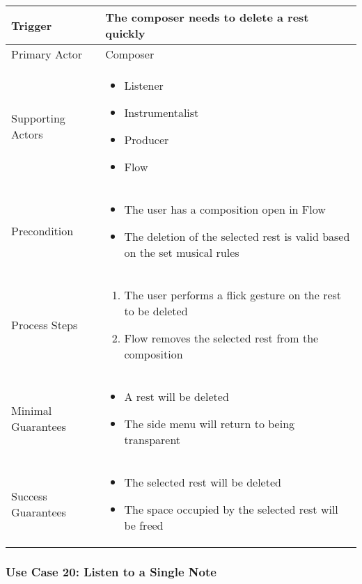   \begin{tabularx}{\textwidth}{|X|X|}
  \hline
  Trigger & 
  The composer needs to delete a rest quickly \\
  \hline
  Primary Actor & 
  Composer\\
  \hline
  Supporting Actors & 
  \begin{itemize}
  \item Listener
  \item Instrumentalist
  \item Producer
  \item Flow
  \end{itemize} \\
  \hline
  Precondition & 
  \begin{itemize}
  \item The user has a composition open in Flow 
  \item The deletion of the selected rest is valid based on the set musical rules
  \end{itemize} \\
  \hline
  Process Steps & 
  \begin{enumerate}
  \item The user performs a flick gesture on the rest to be deleted
  \item Flow removes the selected rest from the composition
  \end{enumerate} \\
  \hline
  Minimal Guarantees & 
  \begin{itemize}
    \item A rest will be deleted
    \item The side menu will return to being transparent
  \end{itemize} \\
  \hline
  Success Guarantees & 
  \begin{itemize}
    \item The selected rest will be deleted
    \item The space occupied by the selected rest will be freed
  \end{itemize} \\
  \hline
  \end{tabularx}

  \subsubsection{Use Case 20: Listen to a Single Note}

